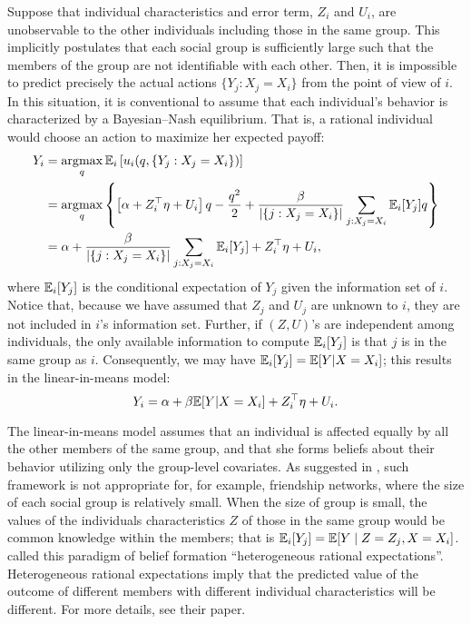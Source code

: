 \documentclass[11pt, A4paper, openany, uplatex]{book}
\begin{document}
Suppose that individual characteristics and error term, $Z_i$ and $U_i$, are unobservable to the other individuals including those in the same group. 
This implicitly postulates that each social group is sufficiently large such that the members of the group are not identifiable with each other.
Then, it is impossible to predict precisely the actual actions $\{Y_j: X_j = X_i \}$ from the point of view of $i$. In this situation, it is conventional to assume that each individual's behavior is characterized by a Bayesian--Nash equilibrium.
That is, a rational individual would choose an action to maximize her expected payoff:
\begin{align*}
	Y_i 
	&=\operatorname*{\arg\!\max}_q \mathbb{E}_i \left[ u_i(q, \{Y_j : X_j = X_i \}) \right] \\
	&=\operatorname*{\arg\!\max}_q \left\{ \left[ \alpha + Z_i^\top \eta  + U_i \right] q -\frac{q^{2}}{2} + \dfrac{\beta}{|\{j : X_j = X_i \}|}\sum_{j : X_j = X_i}  \mathbb{E}_i[Y_j] q \right\} \\
	&= \alpha + \dfrac{\beta}{|\{j : X_j = X_i \}|}\sum_{j : X_j = X_i}  \mathbb{E}_i[Y_j] + Z_i^\top \eta  + U_i,
\end{align*}
where $\mathbb{E}_i[Y_j]$ is the conditional expectation of $Y_j$ given the information set of $i$.
Notice that, because we have assumed that $Z_j$ and $U_j$ are unknown to $i$, they are not included in $i$'s information set.
Further, if $(Z, U)$'s are independent among individuals, the only available information to compute $\mathbb{E}_i[Y_j]$ is that $j$ is in the same group as $i$.
Consequently, we may have $\mathbb{E}_i[Y_j] = \mathbb{E}[Y | X = X_i]$; this results in the linear-in-means model:
\[
	Y_i = \alpha + \beta \mathbb{E}[Y | X = X_i] + Z_i^\top \eta  + U_i.
\]

The linear-in-means model assumes that an individual is affected equally by all the other members of the same group, and that she forms beliefs about their behavior utilizing only the group-level covariates.
As suggested in \cite{lee2014binary}, such framework is not appropriate for, for example, friendship networks, where the size of each social group is relatively small.
When the size of group is small, the values of the individuals characteristics $Z$ of those in the same group would be common knowledge within the members; that is $\mathbb{E}_i[Y_j] = \mathbb{E}[Y \mid Z = Z_j, X = X_i]$.
\cite{lee2014binary} called this paradigm of belief formation ``heterogeneous rational expectations''.
Heterogeneous rational expectations imply that the predicted value of the outcome of different members with different individual characteristics will be different. 
For more details, see their paper.
\end{document}
